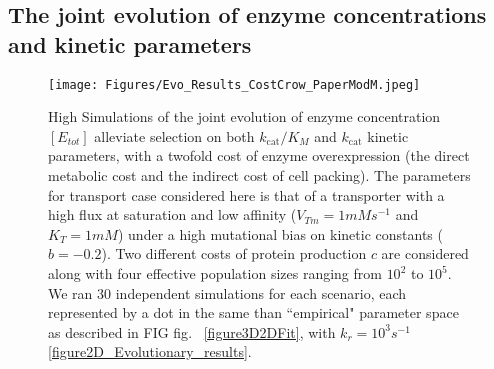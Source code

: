 \documentclass[11pt,onecolumn]{article}
\providecommand{\DIFadd}[1]{{\protect\color{blue} \sf #1}} %
\providecommand{\DIFdel}[1]{{\protect\color{red} \scriptsize #1}} %
\providecommand{\DIFdelbegin}{} %
\providecommand{\DIFaddFL}[1]{\DIFadd{#1}} %
\providecommand{\DIFdelFL}[1]{\DIFdel{#1}} %
\providecommand{\DIFaddbeginFL}{} %
\providecommand{\DIFaddendFL}{} %
\providecommand{\DIFdelbeginFL}{} %
\providecommand{\DIFdelendFL}{} %
\begin{document}
\DIFdelbegin %
\DIFdelendFL \DIFaddbeginFL \subsection{\DIFaddFL{The joint evolution of enzyme concentrations and kinetic parameters}}

\begin{figure}[h!]
\DIFaddendFL \centering
\DIFdelbeginFL %
\DIFdelendFL \DIFaddbeginFL \texttt{[image: Figures/Evo\_Results\_CostCrow\_PaperModM.jpeg]}
\DIFaddendFL \caption{\DIFdelbeginFL \DIFdelFL{High }\DIFdelendFL \DIFaddbeginFL \DIFaddFL{Simulations of the joint evolution of }\DIFaddendFL enzyme concentration \DIFdelbeginFL \DIFdelFL{$[E_{tot}]$ alleviate selection on both $k_\text{cat}/K_M$ }\DIFdelendFL and \DIFdelbeginFL \DIFdelFL{$k_\text{cat}$}\DIFdelendFL \DIFaddbeginFL \DIFaddFL{kinetic parameters, with a twofold cost of enzyme overexpression (the direct metabolic cost and the indirect cost of cell packing)}\DIFaddendFL . The \DIFdelbeginFL \DIFdelFL{parameters for transport }\DIFdelendFL \DIFaddbeginFL \DIFaddFL{case considered here is that of a transporter with a high flux at saturation and low affinity ($V_{Tm}=1 mMs^{-1}$ and $K_T=1mM$) under a high mutational bias on kinetic constants ($b=-0.2$). Two different costs of protein production $c$ }\DIFaddendFL are \DIFaddbeginFL \DIFaddFL{considered along with four effective population sizes ranging from $10^2$ to $10^5$. We ran 30 independent simulations for each scenario, each represented by a dot in }\DIFaddendFL the \DIFdelbeginFL \DIFdelFL{same than }\DIFdelendFL \DIFaddbeginFL \DIFaddFL{``empirical" parameter space as described }\DIFaddendFL in \DIFdelbeginFL \DIFdelFL{FIG}\DIFdelendFL \DIFaddbeginFL \DIFaddFL{fig}\DIFaddendFL .~\DIFdelbeginFL \DIFdelFL{\ref{figure3D2DFit}, with $k_r=10^3s^{-1}$}\DIFdelendFL \DIFaddbeginFL \DIFaddFL{\ref{figure2D_Evolutionary_results}}\DIFaddendFL .
}
\DIFdelbeginFL %
\DIFdelendFL \DIFaddbeginFL \label{figure2D_Evolutionary_results_HF}
\DIFaddendFL \end{figure}
\end{document}
